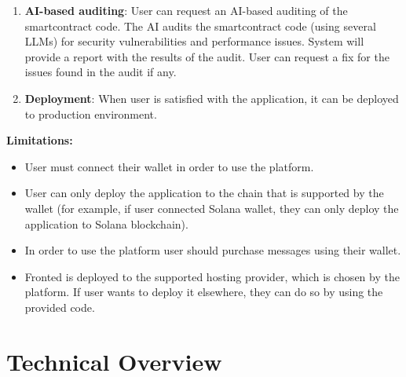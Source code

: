 \documentclass[12pt,a4paper]{article}
\begin{document}
\begin{enumerate}
    \item \textbf{AI-based auditing}: 
    User can request an AI-based auditing of the smartcontract code.
    The AI audits the smartcontract code (using several LLMs) for security vulnerabilities and performance issues.
    System will provide a report with the results of the audit.
    User can request a fix for the issues found in the audit if any.
    
    
    \item \textbf{Deployment}: 
    When user is satisfied with the application, it can be deployed to production environment.

\end{enumerate}

\textbf{Limitations:}
\begin{itemize}
    \item User must connect their wallet in order to use the platform.
    \item User can only deploy the application to the chain that is supported by the wallet (for example, if user connected Solana wallet, they can only deploy the application to Solana blockchain).
    \item In order to use the platform user should purchase messages using their wallet.
    \item Fronted is deployed to the supported hosting provider, which is chosen by the platform. If user wants to deploy it elsewhere, they can do so by using the provided code.

\end{itemize}










\section{Technical Overview}
\label{sec:literature}
\end{document}
